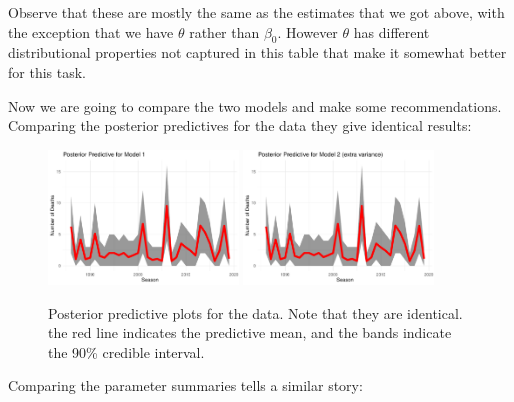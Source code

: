 \documentclass[10pt]{extarticle}
\begin{document}
Observe that these are mostly the same as the estimates that we got above, with the exception that we have $\theta$ rather than $\beta_0$. However $\theta$ has different distributional properties not captured in this table that make it somewhat better for this task. 

Now we are going to compare the two models and make some recommendations. Comparing the posterior predictives for the data they give identical results: 

\begin{figure}[H]
	\centering
	\includegraphics[width = 0.45\textwidth]{../ppmod1}
	\includegraphics[width = 0.45\textwidth]{../ppmod2}
	\caption{Posterior predictive plots for the data. Note that they are identical. the red line indicates the predictive mean, and the bands indicate the 90\% credible interval.}
	\label{fig:postpreddata}
\end{figure}

Comparing the parameter summaries tells a similar story: 
\end{document}

